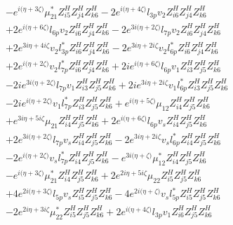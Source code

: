 \begin{align}
 &- e^{i \Big(\eta +3 \zeta \Big)} \mu_{21}^* Z_{{i 5}}^{H} Z_{{j 4}}^{H} Z_{{k 6}}^{H} -2 e^{i \Big(\eta +4 \zeta \Big)} l_{3p} v_2 Z_{{i 6}}^{H} Z_{{j 4}}^{H} Z_{{k 6}}^{H} \nonumber \\ 
 &+2 e^{i \Big(\eta +6 \zeta \Big)} l_{6p} v_2 Z_{{i 6}}^{H} Z_{{j 4}}^{H} Z_{{k 6}}^{H} -2 e^{3 i \Big(\eta +2 \zeta \Big)} l_{7p} v_2 Z_{{i 6}}^{H} Z_{{j 4}}^{H} Z_{{k 6}}^{H} \nonumber \\ 
 &+2 e^{3 i \eta +4 i \zeta } v_2 l_{3p}^* Z_{{i 6}}^{H} Z_{{j 4}}^{H} Z_{{k 6}}^{H} -2 e^{3 i \eta +2 i \zeta } v_2 l_{6p}^* Z_{{i 6}}^{H} Z_{{j 4}}^{H} Z_{{k 6}}^{H} \nonumber \\ 
 &+2 e^{i \Big(\eta +2 \zeta \Big)} v_2 l_{7p}^* Z_{{i 6}}^{H} Z_{{j 4}}^{H} Z_{{k 6}}^{H} +2 i e^{i \Big(\eta +6 \zeta \Big)} l_{6p} v_1 Z_{{i 3}}^{H} Z_{{j 5}}^{H} Z_{{k 6}}^{H} \nonumber \\ 
 &-2 i e^{3 i \Big(\eta +2 \zeta \Big)} l_{7p} v_1 Z_{{i 3}}^{H} Z_{{j 5}}^{H} Z_{{k 6}}^{H} +2 i e^{3 i \eta +2 i \zeta } v_1 l_{6p}^* Z_{{i 3}}^{H} Z_{{j 5}}^{H} Z_{{k 6}}^{H} \nonumber \\ 
 &-2 i e^{i \Big(\eta +2 \zeta \Big)} v_1 l_{7p}^* Z_{{i 3}}^{H} Z_{{j 5}}^{H} Z_{{k 6}}^{H} +e^{i \Big(\eta +5 \zeta \Big)} \mu_{12} Z_{{i 4}}^{H} Z_{{j 5}}^{H} Z_{{k 6}}^{H} \nonumber \\ 
 &+e^{3 i \eta +5 i \zeta } \mu_{21} Z_{{i 4}}^{H} Z_{{j 5}}^{H} Z_{{k 6}}^{H} +2 e^{i \Big(\eta +6 \zeta \Big)} l_{6p} v_s Z_{{i 4}}^{H} Z_{{j 5}}^{H} Z_{{k 6}}^{H} \nonumber \\ 
 &+2 e^{3 i \Big(\eta +2 \zeta \Big)} l_{7p} v_s Z_{{i 4}}^{H} Z_{{j 5}}^{H} Z_{{k 6}}^{H} -2 e^{3 i \eta +2 i \zeta } v_s l_{6p}^* Z_{{i 4}}^{H} Z_{{j 5}}^{H} Z_{{k 6}}^{H} \nonumber \\ 
 &-2 e^{i \Big(\eta +2 \zeta \Big)} v_s l_{7p}^* Z_{{i 4}}^{H} Z_{{j 5}}^{H} Z_{{k 6}}^{H} - e^{3 i \Big(\eta +\zeta \Big)} \mu_{12}^* Z_{{i 4}}^{H} Z_{{j 5}}^{H} Z_{{k 6}}^{H} \nonumber \\ 
 &- e^{i \Big(\eta +3 \zeta \Big)} \mu_{21}^* Z_{{i 4}}^{H} Z_{{j 5}}^{H} Z_{{k 6}}^{H} +2 e^{2 i \eta +5 i \zeta } \mu_{22} Z_{{i 5}}^{H} Z_{{j 5}}^{H} Z_{{k 6}}^{H} \nonumber \\ 
 &+4 e^{2 i \Big(\eta +3 \zeta \Big)} l_{5p} v_s Z_{{i 5}}^{H} Z_{{j 5}}^{H} Z_{{k 6}}^{H} -4 e^{2 i \Big(\eta +\zeta \Big)} v_s l_{5p}^* Z_{{i 5}}^{H} Z_{{j 5}}^{H} Z_{{k 6}}^{H} \nonumber \\ 
 &-2 e^{2 i \eta +3 i \zeta } \mu_{22}^* Z_{{i 5}}^{H} Z_{{j 5}}^{H} Z_{{k 6}}^{H} +2 e^{i \Big(\eta +4 \zeta \Big)} l_{3p} v_1 Z_{{i 6}}^{H} Z_{{j 5}}^{H} Z_{{k 6}}^{H} \nonumber \\ 

\end{align}
